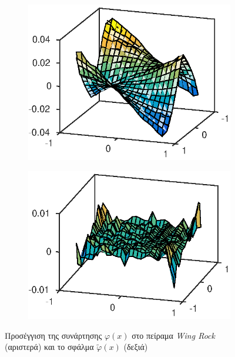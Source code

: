 \begin{figure}
	\begin{subfigure}{0.5\textwidth}
		\includegraphics{plots/experiments/wing_rock/f_approx_surf.eps}
	\end{subfigure}
	\begin{subfigure}{0.5\textwidth}
		\includegraphics{plots/experiments/wing_rock/f_approx_error.eps}
	\end{subfigure}
	\caption{Προσέγγιση της συνάρτησης $\varphi(x)$ στο πείραμα \textit{Wing Rock} (αριστερά) και το σφάλμα $\tilde{\varphi}(x)$ (δεξιά)}
	\label{fig:wing_rock_phi_approximation}
\end{figure}

